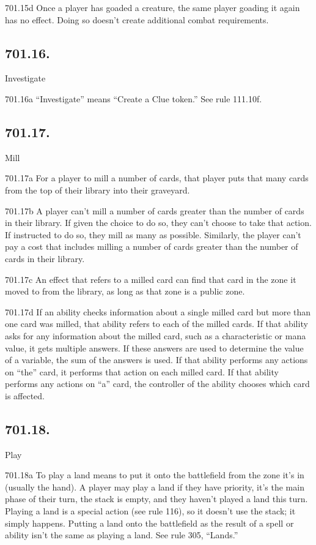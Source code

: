 701.15d Once a player has goaded a creature, the same player goading it again has no effect. Doing so doesn’t create additional combat requirements.

\subsection*{701.16.}
Investigate

701.16a “Investigate” means “Create a Clue token.” See rule 111.10f.

\subsection*{701.17.}
Mill

701.17a For a player to mill a number of cards, that player puts that many cards from the top of their library into their graveyard.

701.17b A player can’t mill a number of cards greater than the number of cards in their library. If given the choice to do so, they can’t choose to take that action. If instructed to do so, they mill as many as possible. Similarly, the player can’t pay a cost that includes milling a number of cards greater than the number of cards in their library.

701.17c An effect that refers to a milled card can find that card in the zone it moved to from the library, as long as that zone is a public zone.

701.17d If an ability checks information about a single milled card but more than one card was milled, that ability refers to each of the milled cards. If that ability asks for any information about the milled card, such as a characteristic or mana value, it gets multiple answers. If these answers are used to determine the value of a variable, the sum of the answers is used. If that ability performs any actions on “the” card, it performs that action on each milled card. If that ability performs any actions on “a” card, the controller of the ability chooses which card is affected.

\subsection*{701.18.}
Play

701.18a To play a land means to put it onto the battlefield from the zone it’s in (usually the hand). A player may play a land if they have priority, it’s the main phase of their turn, the stack is empty, and they haven’t played a land this turn. Playing a land is a special action (see rule 116), so it doesn’t use the stack; it simply happens. Putting a land onto the battlefield as the result of a spell or ability isn’t the same as playing a land. See rule 305, “Lands.”

